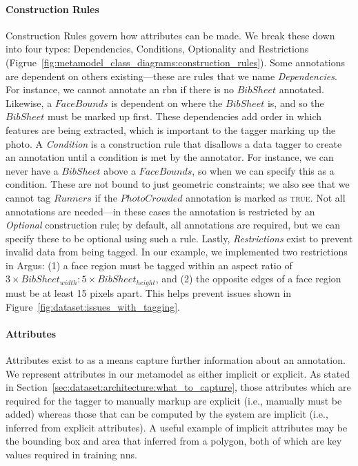 \paragraph{Construction Rules} 

Construction Rules govern how attributes can be made. We break these down into four types: Dependencies, Conditions, Optionality and Restrictions (Figrue~\ref{fig:metamodel_class_diagrams:construction_rules}). Some annotations are dependent on others existing---these are rules that we name \textit{Dependencies}. For instance, we cannot annotate an \gls{rbn} if there is no $BibSheet$ annotated. Likewise, a $FaceBounds$ is dependent on where the $BibSheet$ is, and so the $BibSheet$ must be marked up first. These dependencies add order in which features are being extracted, which is important to the tagger marking up the photo. A \textit{Condition} is a construction rule that disallows a data tagger to create an annotation until a condition is met by the annotator. For instance, we can never have a $BibSheet$ above a $FaceBounds$, so when we can specify this as a condition. These are not bound to just geometric constraints; we also see that we cannot tag $Runners$ if the $PhotoCrowded$ annotation is marked as \textsc{true}. Not all annotations are needed---in these cases the annotation is restricted by an \textit{Optional} construction rule; by default, all annotations are required, but we can specify these to be optional using such a rule. Lastly, \textit{Restrictions} exist to prevent invalid data from being tagged. In our example, we implemented two restrictions in Argus: (1) a face region must be tagged within an aspect ratio of $3 \times BibSheet_{width} : 5 \times BibSheet_{height}$, and (2) the opposite edges of a face region must be at least 15 pixels apart. This helps prevent issues shown in Figure~\ref{fig:dataset:issues_with_tagging}.


\paragraph{Attributes}

Attributes exist to as a means capture further information about an annotation. We represent attributes in our metamodel as either implicit or explicit. As stated in Section~\ref{sec:dataset:architecture:what_to_capture}, those attributes which are required for the tagger to manually markup are explicit (i.e., manually must be added) whereas those that can be computed by the system are implicit (i.e., inferred from explicit attributes). A useful example of implicit attributes may be the bounding box and area that inferred from a polygon, both of which are key values required in training \glspl{nn}.